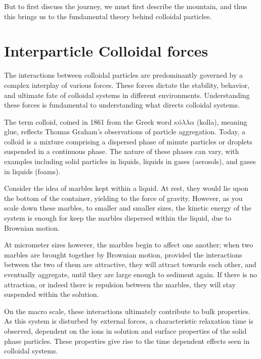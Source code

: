 But to first discuss the journey, we must first describe the mountain, and thus this brings us to the fundamental theory behind colloidal particles.

\section{Interparticle Colloidal forces}

The interactions between colloidal particles are predominantly governed by a complex interplay of various forces. These forces dictate the stability, behavior, and ultimate fate of colloidal systems in different environments. Understanding these forces is fundamental to understanding what directs colloidal systems.

The term colloid, coined in 1861 from the Greek word $κόλλα$ (kolla), meaning glue, reflects Thomas Graham's observations of particle aggregation\cite{old_colloid}. Today, a colloid is a mixture comprising a dispersed phase of minute particles or droplets suspended in a continuous phase. The nature of these phases can vary, with examples including solid particles in liquids, liquids in gases (aerosols), and gases in liquids (foams). 

Consider the idea of marbles kept within a liquid. At rest, they would lie upon the bottom of the container, yielding to the force of gravity\cite{Neuton}. However, as you scale down these marbles, to smaller and smaller sizes, the kinetic energy of the system is enough for keep the marbles dispersed within the liquid, due to Brownian motion\cite{Brown}.

At micrometer sizes however, the marbles begin to affect one another; when two marbles are brought together by Brownian motion, provided the interactions between the two of them are attractive, they will attract towards each other, and eventually aggregate, until they are large enough to sediment again. If there is no attraction, or indeed there is repulsion between the marbles, they will stay suspended within the solution.


On the macro scale, these interactions ultimately contribute to bulk properties. As this system is disturbed by external forces, a characteristic relaxation time is observed, dependent on the ions in solution and surface properties of the solid phase particles. 
These properties give rise to the time dependent effects seen in colloidal systems. 

